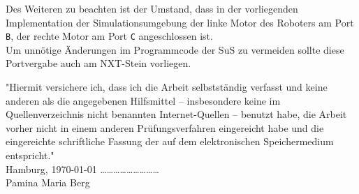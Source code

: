 \documentclass[paper=a4, DIV=calc, BCOR=12mm, twoside=on, onecolumn=on, open = right, titlepage =on, parskip =half-, headsepline = on, footsepline = off, chapterprefix = off, appendixprefix = on, fontsize = 12pt, numbers = noenddot, abstract = on]{scrbook}
\begin{document}

Des Weiteren zu beachten ist der Umstand, dass in der vorliegenden Implementation der Simulationsumgebung der linke Motor des Roboters am Port \texttt{B}, der rechte Motor am Port \texttt{C} angeschlossen ist.\\
Um unnötige Änderungen im Programmcode der SuS zu vermeiden sollte diese Portvergabe auch am NXT-Stein vorliegen.

\cleardoublepage
\newpage
\thispagestyle{empty}
\vspace*{\fill}
"Hiermit versichere ich, dass ich die Arbeit selbstständig verfasst und keine anderen als die angegebenen Hilfsmittel – insbesondere keine im Quellenverzeichnis nicht benannten Internet-Quellen – benutzt habe, die Arbeit vorher nicht in einem anderen Prüfungsverfahren eingereicht habe und die eingereichte schriftliche Fassung der auf dem elektronischen Speichermedium entspricht."\\

Hamburg, \today \hspace*{\fill} \dots \dots \dots \dots \dots \dots \dots \dots \dots\\
\hspace*{\fill} Pamina Maria Berg \quad $\,$
\end{document}
